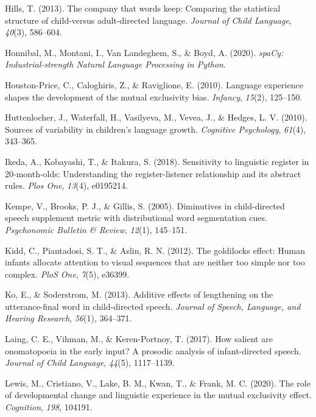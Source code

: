 \documentclass[10pt, letterpaper]{article}
\newenvironment{CSLReferences}%
  {}%
  {\par}
\begin{document}
\begin{CSLReferences}{1}{0}
\leavevmode\hypertarget{ref-hills2013company}{}%
Hills, T. (2013). The company that words keep: Comparing the statistical
structure of child-versus adult-directed language. \emph{Journal of
Child Language}, \emph{40}(3), 586--604.

\leavevmode\hypertarget{ref-honnibal2020spacy}{}%
Honnibal, M., Montani, I., Van Landeghem, S., \& Boyd, A. (2020).
\emph{{spaCy: Industrial-strength Natural Language Processing in
Python}}.

\leavevmode\hypertarget{ref-houston2010language}{}%
Houston-Price, C., Caloghiris, Z., \& Raviglione, E. (2010). Language
experience shapes the development of the mutual exclusivity bias.
\emph{Infancy}, \emph{15}(2), 125--150.

\leavevmode\hypertarget{ref-huttenlocher2010sources}{}%
Huttenlocher, J., Waterfall, H., Vasilyeva, M., Vevea, J., \& Hedges, L.
V. (2010). Sources of variability in children's language growth.
\emph{Cognitive Psychology}, \emph{61}(4), 343--365.

\leavevmode\hypertarget{ref-ikeda2018sensitivity}{}%
Ikeda, A., Kobayashi, T., \& Itakura, S. (2018). Sensitivity to
linguistic register in 20-month-olds: Understanding the
register-listener relationship and its abstract rules. \emph{Plos One},
\emph{13}(4), e0195214.

\leavevmode\hypertarget{ref-kempe2005diminutives}{}%
Kempe, V., Brooks, P. J., \& Gillis, S. (2005). Diminutives in
child-directed speech supplement metric with distributional word
segmentation cues. \emph{Psychonomic Bulletin \& Review}, \emph{12}(1),
145--151.

\leavevmode\hypertarget{ref-kidd2012goldilocks}{}%
Kidd, C., Piantadosi, S. T., \& Aslin, R. N. (2012). The goldilocks
effect: Human infants allocate attention to visual sequences that are
neither too simple nor too complex. \emph{PloS One}, \emph{7}(5),
e36399.

\leavevmode\hypertarget{ref-ko2013additive}{}%
Ko, E., \& Soderstrom, M. (2013). Additive effects of lengthening on the
utterance-final word in child-directed speech. \emph{Journal of Speech,
Language, and Hearing Research}, \emph{56}(1), 364--371.

\leavevmode\hypertarget{ref-laing2017salient}{}%
Laing, C. E., Vihman, M., \& Keren-Portnoy, T. (2017). How salient are
onomatopoeia in the early input? A prosodic analysis of infant-directed
speech. \emph{Journal of Child Language}, \emph{44}(5), 1117--1139.

\leavevmode\hypertarget{ref-lewis2020role}{}%
Lewis, M., Cristiano, V., Lake, B. M., Kwan, T., \& Frank, M. C. (2020).
The role of developmental change and linguistic experience in the mutual
exclusivity effect. \emph{Cognition}, \emph{198}, 104191.


\end{CSLReferences}
\end{document}
